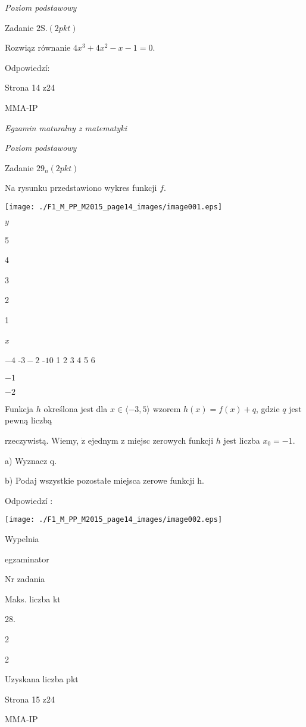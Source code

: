 \documentclass[a4paper,12pt]{article}
\begin{document}
{\it Poziom podstawowy}

Zadanie $2\mathrm{S}. (2pkt)$

Rozwiąz równanie $4x^{3}+4x^{2}-x-1=0.$

Odpowiedzí:

Strona 14 z24

MMA-IP





{\it Egzamin maturalny z matematyki}

{\it Poziom podstawowy}

Zadanie $29_{n}(2pkt)$

Na rysunku przedstawiono wykres funkcji $f.$
\begin{center}
\texttt{[image: ./F1\_M\_PP\_M2015\_page14\_images/image001.eps]}
\end{center}
$y$

5

4

3

2

1

{\it x}

$-4$ -$3  -2$ -$1 0$  1 2  3 4  5 6

$-1$

$-2$

Funkcja $h$ określona jest dla $x\in\langle-3,  5\rangle$ wzorem $h(x)=f(x)+q$, gdzie $q$ jest pewną liczbą

rzeczywistą. Wiemy, $\dot{\mathrm{z}}$ ejednym z miejsc zerowych funkcji $h$ jest liczba $x_{0}=-1.$

a) Wyznacz q.

b) Podaj wszystkie pozostałe miejsca zerowe funkcji h.

Odpowiedzí :
\begin{center}
\texttt{[image: ./F1\_M\_PP\_M2015\_page14\_images/image002.eps]}
\end{center}
Wypelnia

egzaminator

Nr zadania

Maks. liczba kt

28.

2

2

Uzyskana liczba pkt

Strona 15 z24

MMA-IP
\end{document}
